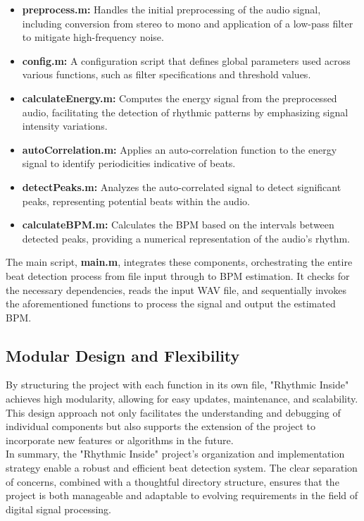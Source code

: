 \begin{itemize}
    \item \textbf{preprocess.m:} Handles the initial preprocessing of the audio signal, including conversion from stereo to mono and application of a low-pass filter to mitigate high-frequency noise.
    \item \textbf{config.m:} A configuration script that defines global parameters used across various functions, such as filter specifications and threshold values.
    \item \textbf{calculateEnergy.m:} Computes the energy signal from the preprocessed audio, facilitating the detection of rhythmic patterns by emphasizing signal intensity variations.
    \item \textbf{autoCorrelation.m:} Applies an auto-correlation function to the energy signal to identify periodicities indicative of beats.
    \item \textbf{detectPeaks.m:} Analyzes the auto-correlated signal to detect significant peaks, representing potential beats within the audio.
    \item \textbf{calculateBPM.m:} Calculates the BPM based on the intervals between detected peaks, providing a numerical representation of the audio's rhythm.
\end{itemize}

The main script, \textbf{main.m}, integrates these components, orchestrating the entire beat detection process from file input through to BPM estimation. It checks for the necessary dependencies, reads the input WAV file, and sequentially invokes the aforementioned functions to process the signal and output the estimated BPM.

\subsection{Modular Design and Flexibility}
By structuring the project with each function in its own file, "Rhythmic Inside" achieves high modularity, allowing for easy updates, maintenance, and scalability. This design approach not only facilitates the understanding and debugging of individual components but also supports the extension of the project to incorporate new features or algorithms in the future. \\

In summary, the "Rhythmic Inside" project's organization and implementation strategy enable a robust and efficient beat detection system. The clear separation of concerns, combined with a thoughtful directory structure, ensures that the project is both manageable and adaptable to evolving requirements in the field of digital signal processing.
